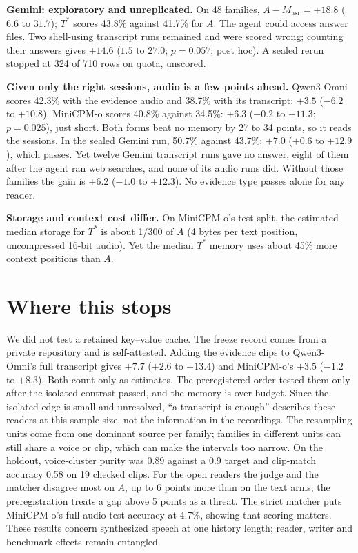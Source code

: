\documentclass[11pt]{article}
\begin{document}
\textbf{Gemini: exploratory and unreplicated.} On 48 families, $A - M_{\mathrm{asr}} = +18.8$
($6.6$ to $31.7$); $T^*$ scores 43.8\% against 41.7\% for $A$.
The agent could access answer files. Two shell-using transcript runs remained and were scored wrong;
counting their answers gives $+14.6$ ($1.5$ to $27.0$; $p = 0.057$; post hoc).
A sealed rerun stopped at 324 of 710 rows on quota, unscored.

\textbf{Given only the right sessions, audio is a few points ahead.}
Qwen3-Omni scores 42.3\% with the evidence audio and 38.7\% with its transcript: $+3.5$ ($-6.2$ to
$+10.8$). MiniCPM-o scores 40.8\% against 34.5\%: $+6.3$ ($-0.2$ to $+11.3$; $p = 0.025$), just short.
Both forms beat no memory by 27 to 34 points, so it reads the sessions. In the sealed Gemini run, 50.7\%
against 43.7\%: $+7.0$ ($+0.6$ to $+12.9$), which passes. Yet twelve Gemini transcript runs gave no answer,
eight of them after the agent ran web searches, and none of its audio runs did. Without those families the
gain is $+6.2$ ($-1.0$ to $+12.3$). No evidence type passes alone for any reader.

\textbf{Storage and context cost differ.} On MiniCPM-o's test split, the estimated median storage
for $T^*$ is about 1/300 of $A$ (4 bytes per text position, uncompressed 16-bit audio).
Yet the median $T^*$ memory uses about 45\% more context positions than $A$.

\section{Where this stops}

We did not test a retained key--value cache. The freeze record comes from a private repository and is
self-attested. Adding the evidence clips to Qwen3-Omni's full transcript gives $+7.7$ ($+2.6$ to $+13.4$)
and MiniCPM-o's $+3.5$ ($-1.2$ to $+8.3$). Both count only as estimates. The preregistered order tested
them only after the isolated contrast passed, and the memory is over budget. Since the isolated edge is
small and unresolved, ``a transcript is enough'' describes these readers at this sample size, not the
information in the recordings. The resampling units come from
one dominant source per family; families in different units can still share a voice or clip, which can make
the intervals too narrow. On the holdout, voice-cluster purity was 0.89 against a 0.9 target and
clip-match accuracy 0.58 on 19 checked clips. For the open readers the judge and the matcher disagree most on $A$,
up to 6 points more than on the text arms; the preregistration treats a gap above 5 points as a threat. The strict matcher puts MiniCPM-o's full-audio
test accuracy at 4.7\%, showing that scoring matters. These results concern synthesized speech at
one history length; reader, writer and benchmark effects remain entangled.
\end{document}
